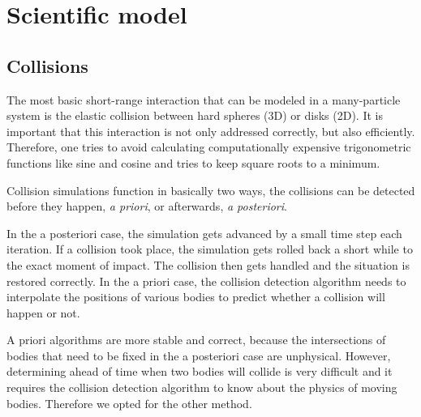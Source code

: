 \section{Scientific model}
\subsection{Collisions}

The most basic short-range interaction that can be modeled in a many-particle 
system is the elastic collision between hard spheres (3D) or disks (2D). It is 
important that this interaction is not only addressed correctly, but also 
efficiently. Therefore, one tries to avoid calculating computationally 
expensive trigonometric functions like sine and cosine and tries to keep square 
roots to a minimum.

Collision simulations function in basically two ways, the collisions can be 
detected before they happen, \emph{a priori}, or afterwards, \emph{a 
posteriori}.

In the a posteriori case, the simulation gets advanced by a small time step 
each iteration. If a collision took place, the simulation gets rolled back a 
short while to the exact moment of impact. The collision then gets handled and 
the situation is restored correctly. In the a priori case, the collision 
detection algorithm needs to interpolate the positions of various bodies to 
predict whether a collision will happen or not.

A priori algorithms are more stable and correct, because the intersections of 
bodies that need to be fixed in the a posteriori case are unphysical. However, 
determining ahead of time when two bodies will collide is very difficult and it 
requires the collision detection algorithm to know about the physics of 
moving bodies. Therefore we opted for the other method.

